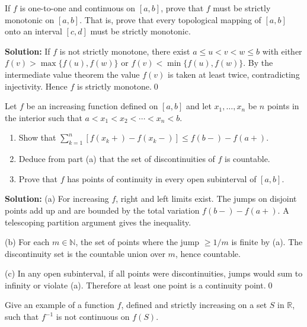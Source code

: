 \begin{problembox}
If $f$ is one-to-one and continuous on $[a, b]$, prove that $f$ must be strictly monotonic on $[a, b]$. That is, prove that every topological mapping of $[a, b]$ onto an interval $[c, d]$ must be strictly monotonic.
\end{problembox}

\noindent\textbf{Solution:}
If $f$ is not strictly monotone, there exist $a\le u<v<w\le b$ with either $f(v)>\max\{f(u),f(w)\}$ or $f(v)<\min\{f(u),f(w)\}$. By the intermediate value theorem the value $f(v)$ is taken at least twice, contradicting injectivity. Hence $f$ is strictly monotone.\qed



\begin{problembox}
Let $f$ be an increasing function defined on $[a, b]$ and let $x_1, \ldots, x_n$ be $n$ points in the interior such that $a < x_1 < x_2 < \cdots < x_n < b$.
\begin{enumerate}[label=(\alph*)]
\item Show that $\sum_{k=1}^n [f(x_k+) - f(x_k-)] \leq f(b-) - f(a+)$.
\item Deduce from part (a) that the set of discontinuities of $f$ is countable.
\item Prove that $f$ has points of continuity in every open subinterval of $[a, b]$.
\end{enumerate}
\end{problembox}

\noindent\textbf{Solution:}
(a) For increasing $f$, right and left limits exist. The jumps on disjoint points add up and are bounded by the total variation $f(b-)-f(a+)$. A telescoping partition argument gives the inequality.

(b) For each $m\in\mathbb{N}$, the set of points where the jump $\ge 1/m$ is finite by (a). The discontinuity set is the countable union over $m$, hence countable.

(c) In any open subinterval, if all points were discontinuities, jumps would sum to infinity or violate (a). Therefore at least one point is a continuity point.\qed



\begin{problembox}
Give an example of a function $f$, defined and strictly increasing on a set $S$ in $\mathbb{R}$, such that $f^{-1}$ is not continuous on $f(S)$.
\end{problembox}

